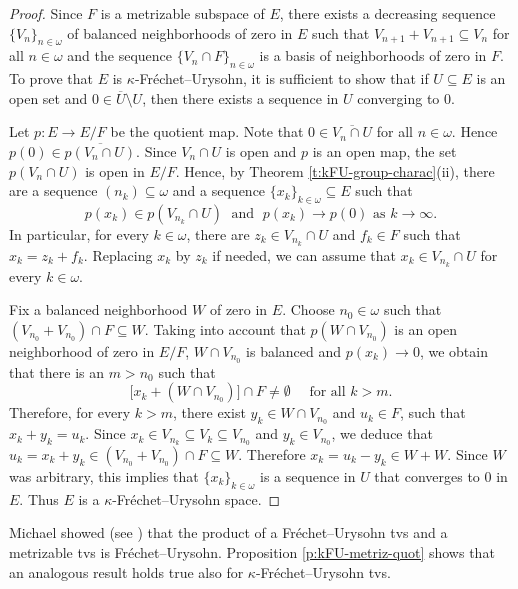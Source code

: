 \documentclass[preprint,11pt]{elsarticle}
\theoremstyle{definition}
\theoremstyle{remark}
\numberwithin{equation}{section}
\numberwithin{theorem}{section}
\newcommand{\w}{\omega}
\newcommand{\SM}{{\setminus}}
\begin{document}
\begin{proof}
Since $F$ is a metrizable subspace of $E$, there exists a decreasing sequence $\{V_n\}_{n\in\w}$ of balanced neighborhoods of zero in $E$ such that $V_{n+1}+V_{n+1}\subseteq V_n$ for all $n\in \w$ and the sequence $\{V_n\cap F\}_{n\in\w}$ is a basis of neighborhoods of zero in $F$. To prove that $E$ is
$\kappa$-Fr\'{e}chet--Urysohn, it is sufficient to show that if $U\subseteq E$ is an open set and $0\in \overline{U}\SM U$, then there exists a sequence in $U$ converging to $0$.

Let $p: E\rightarrow E/F$ be the quotient map. %
Note that $0\in \overline{V_n\cap U}$  for all $n\in \omega$. Hence $p(0)\in \overline{p(V_n\cap U)}$. Since $V_n\cap U$ is open and $p$ is an open map, the set $p(V_n\cap U)$ is open in $E/F$. Hence, by Theorem \ref{t:kFU-group-charac}(ii),  there are a sequence $(n_k)\subseteq \w$ and  a sequence $\{x_{k}\}_{k\in\w}\subseteq E$ such that
\[
p(x_{k})\in p(V_{n_k}\cap U) \; \mbox{ and } \; p(x_{k})\rightarrow p(0) \mbox{ as } k\to \infty.
\]
In particular, for every $k\in\w$, there are $z_k\in V_{n_k}\cap U$ and  $f_k\in F$ such that $x_k=z_k+f_k$. Replacing $x_k$ by $z_k$ if needed, we can assume that $x_k\in V_{n_k}\cap U$ for every $k\in\w$.


Fix a balanced neighborhood $W$ of zero in $E$. Choose $n_0\in \w$ such that $(V_{n_0}+V_{n_0})\cap F\subseteq W$. Taking into account that $p(W\cap V_{n_0})$ is an open neighborhood of zero in $E/F$, $W\cap V_{n_0}$ is balanced and $p(x_{k})\to 0$, we obtain that there is an $m>n_0$ such that
\[
\big[x_k+(W\cap V_{n_0})\big]\cap F\neq \emptyset \quad \mbox{ for all $k>m$.}
\]
Therefore, for every $k>m$, there exist $y_k\in W\cap V_{n_0}$ and  $u_k\in F$, such that $x_k+y_k=u_k$. Since $x_k\in V_{n_k}\subseteq V_k\subseteq V_{n_0}$ and $y_k\in V_{n_0}$, we deduce that $u_k=x_k+y_k\in (V_{n_0}+V_{n_0})\cap F\subseteq W$. Therefore $x_k=u_k-y_k\in W+W$. Since $W$ was arbitrary, this implies that $\{x_k\}_{k\in \w}$ is a sequence in $U$ that converges to $0$ in $E$. Thus $E$ is a $\kappa$-Fr\'{e}chet--Urysohn space.
\end{proof}

Michael showed (see \cite[Corollary~14.3]{kak}) that the product of a Fr\'{e}chet--Urysohn tvs and a metrizable tvs is Fr\'{e}chet--Urysohn. Proposition \ref{p:kFU-metriz-quot} shows that an analogous result holds true also for $\kappa$-Fr\'{e}chet--Urysohn tvs.
\end{document}
